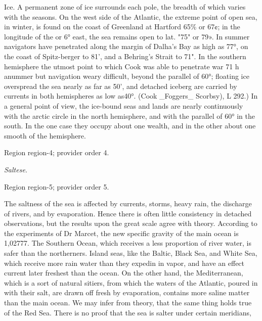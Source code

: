 \documentclass[11pt]{article}
\begin{document}
Ice. A permanent zone of ice surrounds each pole, the breadth of which varies with the seasons. On the west side of the Atlantic, the extreme point of open sea, in winter, is found on the coast of Greenland at Hartford 65\% or 67¢; in the longitude of the or 6° east, the sea remains open to lat. "75" or 79». In summer navigators have penetrated along the margin of Dalha's Bay as high as 77°, on the coast of Spitz-berger to 81', and a Behring's Strait to 71". In the southern hemisphere the utmost point to which Cook was able to penetrate war 71 h anummer but navigation weary difficult, beyond the parallel of 60°; floating ice overspread the sea nearly as far as 50', and detached iceberg are carried by currents in both hemispheres as low as40°. (Cook \_Foggers\_ Scorbsy), L 292.) In a general point of view, the ice-bound seas and lands are nearly continuously with the arctic circle in the north hemisphere, and with the parallel of 60° in the south. In the one case they occupy about one wealth, and in the other about one smooth of the hemisphere.
\par

{\scriptsize\color{gray} Region region-4; provider order 4.\par}
\medskip

{\small\itshape Saltese.\par}

{\scriptsize\color{gray} Region region-5; provider order 5.\par}
\medskip

The saltness of the sea is affected by currents, storms, heavy rain, the discharge of rivers, and by evaporation. Hence there is often little consistency in detached observations, but the results upon the great scale agree with theory. According to the experiments of Dr Marcet, the new specific gravity of the main ocean is 1,02777. The Southern Ocean, which receives a less proportion of river water, is safer than the northerners. Island seas, like the Baltic, Black Sea, and White Sea, which receive more rain water than they expedin in vapor, and have an effect current later freshest than the ocean. On the other hand, the Mediterranean, which is a sort of natural sitiers, from which the waters of the Atlantic, poured in with their salt, are drawn off fresh by evaporation, contains more saline matter than the main ocean. We may infer from theory, that the same thing holds true of the Red Sea. There is no proof that the sea is salter under certain meridians,
\par
\end{document}
